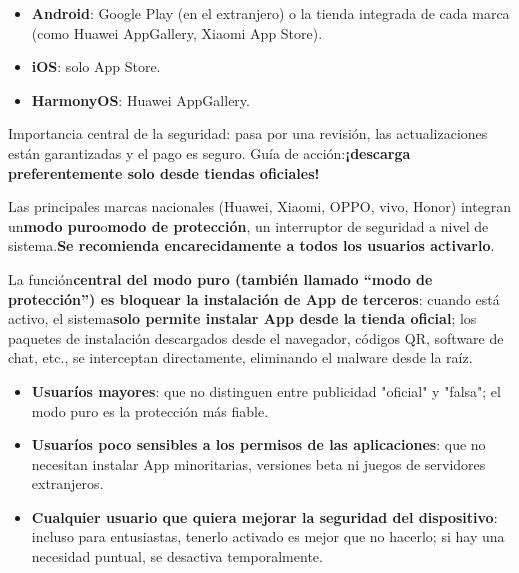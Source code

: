 


\begin{itemize}
  \item \textbf{Android}: Google Play (en el extranjero) o la tienda integrada de cada marca (como Huawei AppGallery, Xiaomi App Store).
  \item \textbf{iOS}: solo App Store.
  \item \textbf{HarmonyOS}: Huawei AppGallery.
\end{itemize}

Importancia central de la seguridad: pasa por una revisión, las actualizaciones están garantizadas y el pago es seguro. Guía de acción:\textbf{¡descarga preferentemente solo desde tiendas oficiales!}


Las principales marcas nacionales (Huawei, Xiaomi, OPPO, vivo, Honor) integran un\textbf{modo puro}o\textbf{modo de protección}, un interruptor de seguridad a nivel de sistema.\textbf{Se recomienda encarecidamente a todos los usuarios activarlo}.


La función\textbf{central del modo puro (también llamado “modo de protección”) es bloquear la instalación de App de terceros}: cuando está activo, el sistema\textbf{solo permite instalar App desde la tienda oficial}; los paquetes de instalación descargados desde el navegador, códigos QR, software de chat, etc., se interceptan directamente, eliminando el malware desde la raíz.


\begin{itemize}
  \item \textbf{Usuaríos mayores}: que no distinguen entre publicidad "oficial" y "falsa"; el modo puro es la protección más fiable.
  \item \textbf{Usuaríos poco sensibles a los permisos de las aplicaciones}: que no necesitan instalar App minoritarias, versiones beta ni juegos de servidores extranjeros.
  \item \textbf{Cualquier usuario que quiera mejorar la seguridad del dispositivo}: incluso para entusiastas, tenerlo activado es mejor que no hacerlo; si hay una necesidad puntual, se desactiva temporalmente.
\end{itemize}


